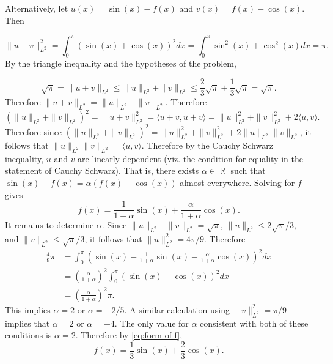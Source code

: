 \documentclass[answers]{exam}
\DeclareMathOperator{\RR}{\mathbb{R}}
\begin{document}
\begin{questions}
\begin{solution}
    Alternatively, let $u(x)= \sin(x)-f(x)$ and $v(x)=f(x)-\cos(x)$. Then

\begin{equation*}
  \| u + v \|_{L^{2}}^{2} = \int_{0}^{\pi}\left( \sin(x)+\cos(x) \right)^{2}dx = \int_{0}^{\pi} \sin^{2}(x)+ \cos^{2}(x)dx =\pi.
\end{equation*}
By the triangle inequality and the hypotheses of the problem,

\begin{equation*}
  \sqrt{\pi}= \| u+v \|_{L^{2}} \leq \| u \|_{L^{2}} + \| v \|_{L^{2}} \leq \frac{2}{3}\sqrt{\pi}+ \frac{1}{3}\sqrt{\pi}=\sqrt{\pi}.
\end{equation*}
Therefore
$\| u+v \|_{L^{2}} = \| u \|_{L^{2}} + \| v \|_{L^{2}}$. Therefore
\begin{equation*}
  \left( \| u \|_{L^{2}}+ \| v \|_{L^{2}} \right)^{2} = \| u+v \|_{L^{2}}^{2} = \langle u+v, u+v\rangle = \| u \|^{2}_{L^{2}}+\| v \|^{2}_{L^{2}} + 2\langle u,v\rangle.
\end{equation*}
Therefore since $  \left( \| u \|_{L^{2}}+ \| v \|_{L^{2}} \right)^{2}= \| u \|_{L^{2}}^{2}+\| v \|_{L^{2}}^{2}+2 \| u \|_{L^{2}}\| v \|_{L^{2}}$, it follows that $\| u \|_{L^{2}} \| v \|_{L^{2}}= \langle u, v \rangle$. Therefore by the Cauchy Schwarz inequality, $u$ and $v$ are linearly dependent (viz. the condition for equality in the statement of Cauchy Schwarz). That is, there exists $\alpha \in \RR$ such that $\sin(x)-f(x)= \alpha \left( f(x)-\cos(x) \right)$ almost everywhere. Solving for $f$ gives
\begin{equation}\label{eq:form-of-f}
  f(x) = \frac{1}{1+\alpha}\sin(x)+ \frac{\alpha}{1+\alpha}\cos(x).
\end{equation}
It remains to determine $\alpha$. Since $\| u \|_{L^{2}}+ \| v \|_{L^{2}}=\sqrt{\pi}$, $\| u \|_{L^{2}}\leq 2 \sqrt{\pi}/3$, and $\| v \|_{L^{2}}\leq \sqrt{\pi}/3$, it follows that $\| u \|^2_{L^{2}} = 4 \pi/9$. Therefore
\begin{align*}
  \frac{4}{9}\pi &= \int_{0}^{\pi}\left( \sin(x)- \frac{1}{1+\alpha}\sin(x) -\frac{\alpha}{1+\alpha}\cos(x)\right)^{2}dx\\
                 &= \left( \frac{\alpha}{1+\alpha} \right)^{2}\int_{0}^{\pi}\left( \sin(x)-\cos(x) \right)^{2}dx\\
                 &=  \left( \frac{\alpha}{1+\alpha} \right)^{2}\pi.
\end{align*}
This implies $\alpha = 2$ or $\alpha= -2/5$. A similar calculation using $\| v \|^{2}_{L^{2}}= \pi /9$ implies that $\alpha = 2$ or $\alpha = -4$. The only value for $\alpha$ consistent with both of these conditions is $\alpha =2$. Therefore by \eqref{eq:form-of-f},
\begin{equation*}
  f(x) = \frac{1}{3}\sin(x)+ \frac{2}{3}\cos(x).
\end{equation*}
\end{solution}


\end{questions}
\end{document}
